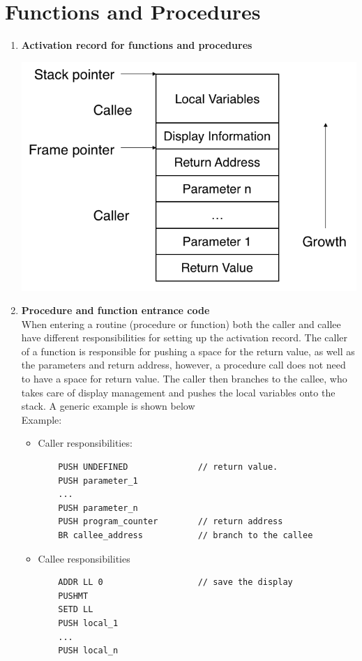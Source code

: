 \documentclass[11pt]{article}
\begin{document}
\section*{Functions and Procedures}
\begin{enumerate}[label=(\alph*)]
\item \textbf{Activation record for functions and procedures}\\
\begin{center}
\includegraphics[scale=0.75]{activation_record}
\end{center}

\item \textbf{Procedure and function entrance code}\\
When entering a routine (procedure or function) both the caller and callee have different responsibilities for setting up the activation record. The caller of a function is responsible for pushing a space for the return value, as well as the parameters and return address, however, a procedure call does not need to have a space for return value. The caller then branches to the callee, who takes care of display management and pushes the local variables onto the stack. A generic example is shown below\\
Example:
\begin{itemize}
\item Caller responsibilities:
\begin{lstlisting}
    PUSH UNDEFINED              // return value.
    PUSH parameter_1
    ...
    PUSH parameter_n
    PUSH program_counter        // return address
    BR callee_address           // branch to the callee
\end{lstlisting}
\item Callee responsibilities
\begin{lstlisting}
    ADDR LL 0                   // save the display
    PUSHMT
    SETD LL
    PUSH local_1
    ...
    PUSH local_n
\end{lstlisting}
\end{itemize}


\end{enumerate}
\end{document}
